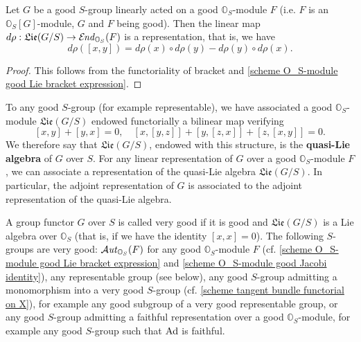 \begin{corollary}\label{scheme O_S-module good representation induced}
Let $G$ be a good $S$-group linearly acted on a good $\mathbb{O}_S$-module $F$ (i.e. $F$ is an $\mathbb{O}_S[G]$-module, $G$ and $F$ being good). Then the linear map $d\rho:\mathfrak{Lie}(G/S)\to\operatorname{\mathcal{E}\hspace*{-1pt}\textit{nd}\hspace{0.5pt}}_{\mathbb{O}_S}(F)$ is a representation, that is, we have
\[d\rho([x,y])=d\rho(x)\circ d\rho(y)-d\rho(y)\circ d\rho(x).\]
\end{corollary}
\begin{proof}
This follows from the functoriality of bracket and \cref{scheme O_S-module good Lie bracket expression}.
\end{proof}

To any good $S$-group (for example representable), we have associated a good $\mathbb{O}_S$-module $\mathfrak{Lie}(G/S)$ endowed functorially a bilinear map verifying
\[[x,y]+[y,x]=0,\quad [x,[y,z]]+[y,[z,x]]+[z,[x,y]]=0.\]
We therefore say that $\mathfrak{Lie}(G/S)$, endowed with this structure, is the \textbf{quasi-Lie algebra} of $G$ over $S$. For any linear representation of $G$ over a good $\mathbb{O}_S$-module $F$, we can associate a representation of the quasi-Lie algebra $\mathfrak{Lie}(G/S)$. In particular, the adjoint representation of $G$ is associated to the adjoint representation of the quasi-Lie algebra.

\begin{example}\label{scheme group very good example}
A group functor $G$ over $S$ is called very good if it is good and $\mathfrak{Lie}(G/S)$ is a Lie algebra over $\mathbb{O}_S$ (that is, if we have the identity $[x,x]=0$). The following $S$-groups are very good: $\operatorname{\mathcal{A}\hspace*{-0.2pt}\textit{ut}\hspace{0.5pt}}_{\mathbb{O}_S}(F)$ for any good $\mathbb{O}_S$-module $F$ (cf. \cref{scheme O_S-module good Lie bracket expression} and \cref{scheme O_S-module good Jacobi identity}), any representable group (see below), any good $S$-group admitting a monomorphism into a very good $S$-group (cf. \cref{scheme tangent bundle functorial on X}), for example any good subgroup of a very good representable group, or any good $S$-group admitting a faithful representation over a good $\mathbb{O}_S$-module, for example any good $S$-group such that $\mathrm{Ad}$ is faithful.
\end{example}

